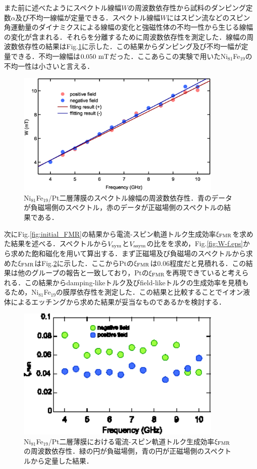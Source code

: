 また前に述べたようにスペクトル線幅$W$の周波数依存性から試料のダンピング定数$\alpha$及び不均一線幅が定量できる．スペクトル線幅$W$にはスピン流などのスピン角運動量のダイナミクスによる線幅の変化と強磁性体の不均一性から生じる線幅の変化が含まれる．それらを分離するために周波数依存性を測定した．線幅の周波数依存性の結果はFig.\ref{fig:V-f}に示した．この結果からダンピング及び不均一幅が定量できる．不均一線幅は$0.050\rm\ mT$だった．ここあらこの実験で用いたNi$_{81}$Fe$_{19}$の不均一性は小さいと言える．
\begin{figure}[htbp]
\centerline{
\includegraphics[width=10cm]{images/W-f.eps}
}
\caption{Ni$_{81}$Fe$_{19}$/Pt二層薄膜のスペクトル線幅の周波数依存性．青のデータが負磁場側のスペクトル，赤のデータが正磁場側のスペクトルの結果である．
}
\label{fig:V-f} 
\end{figure}


次にFig.\ref{fig:initial_FMR}の結果から電流-スピン軌道トルク生成効率$\xi_{\rm FMR}$を求めた結果を述べる．スペクトルから$V_{\rm sym}$と$V_{\rm asym}$の比をを求め，Fig.\ref{fig:W-f.eps}から求めた飽和磁化を用いて算出する．まず正磁場及び負磁場のスペクトルから求めた$\xi_{\rm FMR}$はFig.\ref{fig:xi_initial}に示した．ここからPtの$\xi_{\rm FMR}$は0.06程度だと見積れる．この結果は他のグループの報告と一致しており，Ptの$\xi_{\rm FMR}$を再現できていると考えられる．この結果からdamping-likeトルク及びfield-likeトルクの生成効率を見積もるため，Ni$_{81}$Fe$_{19}$の膜厚依存性を測定した．この結果と比較することでイオン液体によるエッチングから求めた結果が妥当なものであるかを検討する．

\begin{figure}[htbp]
\centerline{
\includegraphics[width=10cm]{images/xi_initial.eps}
}
\caption{Ni$_{81}$Fe$_{19}$/Pt二層薄膜における電流-スピン軌道トルク生成効率$\xi_{\rm FMR}$の周波数依存性．緑の円が負磁場側，青の円が正磁場側のスペクトルから定量した結果．
}
\label{fig:xi_initial} 
\end{figure}




